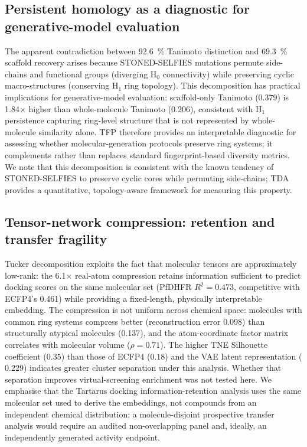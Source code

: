 \documentclass[11pt,a4paper]{article}
\begin{document}
\subsection{Persistent homology as a diagnostic for generative-model evaluation}

The apparent contradiction between \qty{92.6}{\percent} Tanimoto distinction and \qty{69.3}{\percent} scaffold recovery arises because STONED-SELFIES mutations permute side-chains and functional groups (diverging H$_0$ connectivity) while preserving cyclic macro-structures (conserving H$_1$ ring topology). This decomposition has practical implications for generative-model evaluation: scaffold-only Tanimoto (\num{0.379}) is \num{1.84}$\times$ higher than whole-molecule Tanimoto (\num{0.206}), consistent with H$_1$ persistence capturing ring-level structure that is not represented by whole-molecule similarity alone. TFP therefore provides an interpretable diagnostic for assessing whether molecular-generation protocols preserve ring systems; it complements rather than replaces standard fingerprint-based diversity metrics. We note that this decomposition is consistent with the known tendency of STONED-SELFIES to preserve cyclic cores while permuting side-chains; TDA provides a quantitative, topology-aware framework for measuring this property.

\subsection{Tensor-network compression: retention and transfer fragility}

Tucker decomposition exploits the fact that molecular tensors are approximately low-rank: the \num{6.1}$\times$ real-atom compression retains information sufficient to predict docking scores on the same molecular set (PfDHFR $R^2 = \num{0.473}$, competitive with ECFP4's \num{0.461}) while providing a fixed-length, physically interpretable embedding. The compression is not uniform across chemical space: molecules with common ring systems compress better (reconstruction error \num{0.098}) than structurally atypical molecules (\num{0.137}), and the atom-coordinate factor matrix correlates with molecular volume ($\rho = \num{0.71}$). The higher TNE Silhouette coefficient ($\num{0.35}$) than those of ECFP4 ($\num{0.18}$) and the VAE latent representation ($\num{0.229}$) indicates greater cluster separation under this analysis. Whether that separation improves virtual-screening enrichment was not tested here. We emphasise that the Tartarus docking information-retention analysis uses the same molecular set used to derive the embeddings, not compounds from an independent chemical distribution; a molecule-disjoint prospective transfer analysis would require an audited non-overlapping panel and, ideally, an independently generated activity endpoint.
\end{document}

